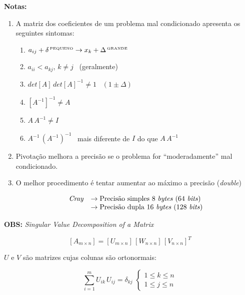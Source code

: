 \textbf{Notas:}

\begin{enumerate}

\item A matriz dos coeficientes de um problema mal condicionado apresenta os seguintes sintomas:

\begin{enumerate}

\item $ a_{ij} + \delta^{ \, \mbox{\tiny{PEQUENO}}} \rightarrow x_k + \Delta^{ \, \mbox{\tiny{GRANDE}}} $

\item $ a_{ii} < a_{kj} $, $ k \neq j $ \, (geralmente)

\item $ det [A] \, det[A]^{-1} \neq 1 $ \, $ (1 \pm \Delta) $

\item $ [A^{-1}]^{-1} \neq A $

\item $ A \, A^{-1} \neq I $

\item $ A^{-1} \, (A^{-1})^{-1} $ \, mais diferente de $I$ do que $ A \, A^{-1} $

\end{enumerate}

\item Pivotação melhora a precisão se o problema for ``moderadamente'' mal condicionado.

\item O melhor procedimento é tentar aumentar ao máximo a precisão (\textit{double})

\[
 \begin{array}{ll}
   \mbox{\textit{Cray}} & \rightarrow \mbox{Precisão simples 8 \textit{bytes} (64 \textit{bits})}\\
   			& \rightarrow \mbox{Precisão dupla 16 \textit{bytes} (128 \textit{bits})}
 \end{array}
\]

\end{enumerate}

\textbf{OBS:} \textit{Singular Value Decomposition of a Matrix}

{
\Large{
\[
 [A_{m \times n}] = [U_{m \times n}] \, [W_{n \times n}] \, [V_{n \times n}]^T
\]
}
}

$U$ e $V$ são matrizes cujas colunas são ortonormais:

\[
 \displaystyle \sum_{i=1}^m U_{ik} \, U_{ij} = \delta_{kj} \, \,
 \left\{
 \begin{array}{l}
   1 \leq k \leq n\\
   1 \leq j \leq n
 \end{array}
 \right.
\]

